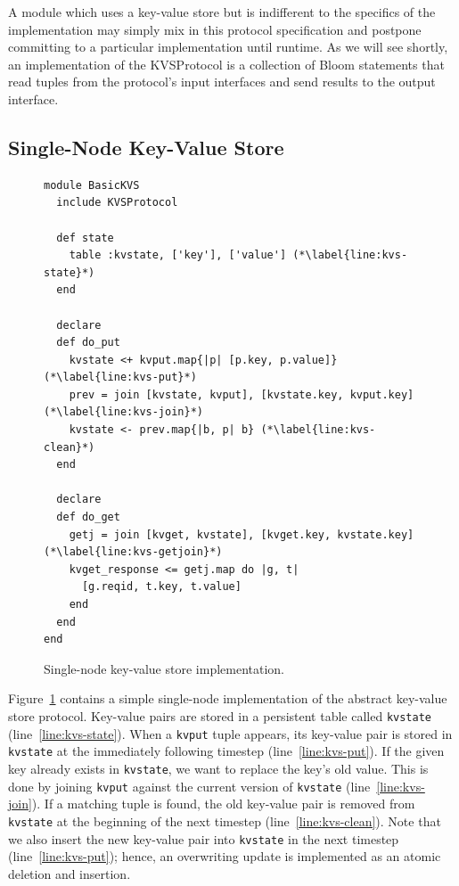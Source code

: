 A module which uses a key-value store but is indifferent to the specifics of the
implementation may simply mix in this protocol specification and postpone
committing to a particular implementation until runtime. As we will see shortly,
an implementation of the KVSProtocol is a collection of Bloom statements that
read tuples from the protocol's input interfaces and send results to the output
interface.

\subsection{Single-Node Key-Value Store}
\label{sec:simple-kvs}
\begin{figure}[t]
\begin{scriptsize}
\begin{lstlisting}
module BasicKVS
  include KVSProtocol

  def state
    table :kvstate, ['key'], ['value'] (*\label{line:kvs-state}*)
  end

  declare
  def do_put
    kvstate <+ kvput.map{|p| [p.key, p.value]} (*\label{line:kvs-put}*) 
    prev = join [kvstate, kvput], [kvstate.key, kvput.key] (*\label{line:kvs-join}*)
    kvstate <- prev.map{|b, p| b} (*\label{line:kvs-clean}*)
  end

  declare
  def do_get
    getj = join [kvget, kvstate], [kvget.key, kvstate.key] (*\label{line:kvs-getjoin}*)
    kvget_response <= getj.map do |g, t|
      [g.reqid, t.key, t.value]
    end
  end
end
\end{lstlisting}
\centering
\vspace{-10pt}
\caption{Single-node key-value store implementation.}
\label{fig:kvs-impl}
\end{scriptsize}
\vspace{-2pt}
\end{figure}

Figure~\ref{fig:kvs-impl} contains a simple single-node implementation of the
abstract key-value store protocol. Key-value pairs are stored in a persistent
table called \texttt{kvstate} (line~\ref{line:kvs-state}). When a \texttt{kvput}
tuple appears, its key-value pair is stored in \texttt{kvstate} at the
immediately following timestep (line~\ref{line:kvs-put}).  If the given key
already exists in \texttt{kvstate}, we want to replace the key's old value. This
is done by joining \texttt{kvput} against the current version of
\texttt{kvstate} (line~\ref{line:kvs-join}). If a matching tuple is found, the
old key-value pair is removed from \texttt{kvstate} at the beginning of the next
timestep (line~\ref{line:kvs-clean}). Note that we also insert the new key-value
pair into \texttt{kvstate} in the next timestep (line~\ref{line:kvs-put});
hence, an overwriting update is implemented as an atomic deletion and insertion.

